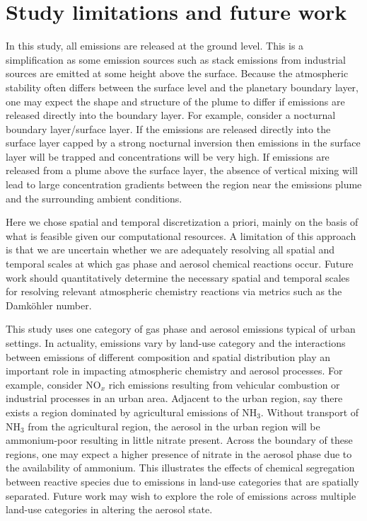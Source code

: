 \section{Study limitations and future work}

In this study, all emissions are released at the ground level. This is a simplification as some emission sources such as stack emissions from industrial sources are emitted at some height above the surface. Because the atmospheric stability often differs between the surface level and the planetary boundary layer, one may expect the shape and structure of the plume to differ if emissions are released directly into the boundary layer. For example, consider a nocturnal boundary layer/surface layer. If the emissions are released directly into the surface layer capped by a strong nocturnal inversion then emissions in the surface layer will be trapped and concentrations will be very high. If emissions are released from a plume above the surface layer, the absence of vertical mixing will lead to large concentration gradients between the region near the emissions plume and the surrounding ambient conditions. 

Here we chose spatial and temporal discretization a priori, mainly on the basis of what is feasible given our computational resources. A limitation of this approach is that we are uncertain whether we are adequately resolving all spatial and temporal scales at which gas phase and aerosol chemical reactions occur. Future work should quantitatively determine the necessary spatial and temporal scales for resolving relevant atmospheric chemistry reactions via metrics such as the Damköhler number.

This study uses one category of gas phase and aerosol emissions typical of urban settings. In actuality, emissions vary by land-use category and the interactions between emissions of different composition and spatial distribution play an important role in impacting atmospheric chemistry and aerosol processes. For example, consider NO$_x$ rich emissions resulting from vehicular combustion or industrial processes in an urban area. Adjacent to the urban region, say there exists a region dominated by agricultural emissions of NH$_3$. Without transport of NH$_3$ from the agricultural region, the aerosol in the urban region will be ammonium-poor resulting in little nitrate present. Across the boundary of these regions, one may expect a higher presence of nitrate in the aerosol phase due to the availability of ammonium. This illustrates the effects of chemical segregation between reactive species due to emissions in land-use categories that are spatially separated. Future work may wish to explore the role of emissions across multiple land-use categories in altering the aerosol state. 

